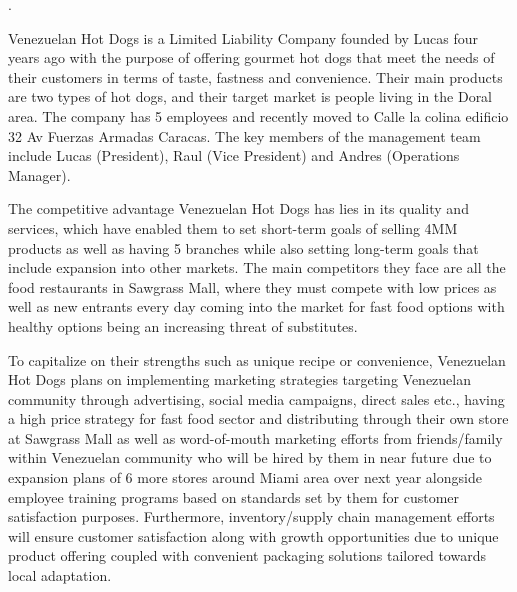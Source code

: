 .

Venezuelan Hot Dogs is a Limited Liability Company founded by Lucas four years ago with the purpose of offering gourmet hot dogs that meet the needs of their customers in terms of taste, fastness and convenience. Their main products are two types of hot dogs, and their target market is people living in the Doral area. The company has 5 employees and recently moved to Calle la colina edificio 32 Av Fuerzas Armadas Caracas. The key members of the management team include Lucas (President), Raul (Vice President) and Andres (Operations Manager). 

The competitive advantage Venezuelan Hot Dogs has lies in its quality and services, which have enabled them to set short-term goals of selling 4MM products as well as having 5 branches while also setting long-term goals that include expansion into other markets. The main competitors they face are all the food restaurants in Sawgrass Mall, where they must compete with low prices as well as new entrants every day coming into the market for fast food options with healthy options being an increasing threat of substitutes. 

To capitalize on their strengths such as unique recipe or convenience, Venezuelan Hot Dogs plans on implementing marketing strategies targeting Venezuelan community through advertising, social media campaigns, direct sales etc., having a high price strategy for fast food sector and distributing through their own store at Sawgrass Mall as well as word-of-mouth marketing efforts from friends/family within Venezuelan community who will be hired by them in near future due to expansion plans of 6 more stores around Miami area over next year alongside employee training programs based on standards set by them for customer satisfaction purposes. Furthermore, inventory/supply chain management efforts will ensure customer satisfaction along with growth opportunities due to unique product offering coupled with convenient packaging solutions tailored towards local adaptation.